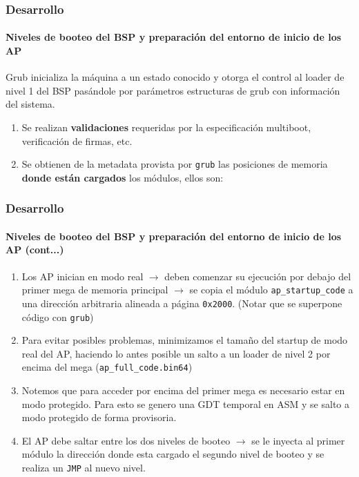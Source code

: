 \documentclass{beamer}
\begin{document}
\begin{frame}
  \frametitle{Desarrollo}
  \framesubtitle{Niveles de booteo del BSP y preparación del entorno de inicio de los AP}
  \small Grub inicializa la máquina a un estado conocido y otorga el control al loader de nivel 1 del BSP pasándole por parámetros estructuras de grub con información del sistema.
  \pause
  \begin{enumerate}
  \item Se realizan \textbf{validaciones} requeridas por la especificación multiboot, verificación de firmas, etc.
  \pause
  \item Se obtienen de la metadata provista por \texttt{grub} las posiciones de memoria \textbf{donde están cargados} los módulos, ellos son:
  \vspace{0.1cm}
  \end{enumerate}
\end{frame}

\begin{frame}
  \frametitle{Desarrollo}
  \framesubtitle{Niveles de booteo del BSP y preparación del entorno de inicio de los AP (cont...)}
  \begin{enumerate}
    \setlength{\itemsep}{10pt}
   \small
  \item Los AP inician en modo real $\rightarrow$ deben comenzar su ejecución por debajo del primer mega de memoria principal $\rightarrow$
  se copia el módulo \texttt{ap\_startup\_code} a una dirección arbitraria alineada a página \texttt{0x2000}. (Notar que se superpone código con \texttt{grub})
  \pause  
  \item Para evitar posibles problemas, minimizamos el tamaño del startup de modo real del AP, haciendo lo antes posible un salto a un loader de nivel 2 por encima del mega (\texttt{ap\_full\_code.bin64})
  \pause
  \item Notemos que para acceder por encima del primer mega es necesario estar en modo protegido. Para esto se genero una GDT temporal en ASM y se salto a modo protegido de forma provisoria.
  \pause
  \item El AP debe saltar entre los dos niveles de booteo $\rightarrow$ se le inyecta al primer módulo la dirección donde esta cargado el segundo nivel de booteo y se realiza un \texttt{JMP} al nuevo nivel.
  \end{enumerate}
\end{frame} 
\end{document}

